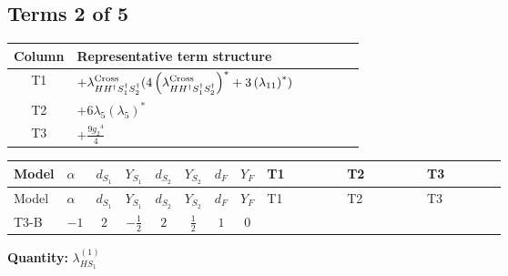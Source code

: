 \documentclass[8pt]{article}
\begin{document}
\begin{landscape}
\subsection*{Terms 2 of 5}
\begin{center}
\begin{tabular}{@{}c >{\raggedright\arraybackslash}p{0.82\linewidth}@{}}
\toprule
Column & Representative term structure \\
\midrule
T1 & \(\displaystyle +{\lambda_{H H^\dagger S_1^\dagger S_2^\dagger}^{\rm Cross}} (4 \left({\lambda_{H H^\dagger S_1^\dagger S_2^\dagger}^{\rm Cross}}\right)^{*}+3 \left({\lambda_{11}}\right)^{*})\) \\
\midrule
T2 & \(\displaystyle +6 {\lambda_5} \left({\lambda_5}\right)^{*}\) \\
\midrule
T3 & \(\displaystyle +\frac{9 {g_2}^4}{4}\) \\
\midrule
\bottomrule
\end{tabular}
\end{center}
\smallskip
\tiny
\begin{longtable}{@{}llcccccc >{\raggedright\arraybackslash}p{0.21\linewidth} >{\raggedright\arraybackslash}p{0.21\linewidth} >{\raggedright\arraybackslash}p{0.21\linewidth}@{}}
\toprule
Model & $\alpha$ & $d_{S_1}$ & $Y_{S_1}$ & $d_{S_2}$ & $Y_{S_2}$ & $d_F$ & $Y_F$ & T1 & T2 & T3 \\
\midrule
\endfirsthead
\toprule
Model & $\alpha$ & $d_{S_1}$ & $Y_{S_1}$ & $d_{S_2}$ & $Y_{S_2}$ & $d_F$ & $Y_F$ & T1 & T2 & T3 \\
\midrule
\endhead
T3-B & $-1$ & $2$ & $-\frac{1}{2}$ & $2$ & $\frac{1}{2}$ & $1$ & $0$ & \scriptsize\adjustbox{max width=\linewidth}{$\begin{gathered} +{\lambda_{H H^\dagger S_1^\dagger S_2^\dagger}^{\rm Cross}} (4 \left({\lambda_{H H^\dagger S_1^\dagger S_2^\dagger}^{\rm Cross}}\right)^{*}+3 \left({\lambda_{11}}\right)^{*})\end{gathered}$} & \scriptsize\adjustbox{max width=\linewidth}{$\begin{gathered} +6 {\lambda_5} \left({\lambda_5}\right)^{*}\end{gathered}$} & \scriptsize\adjustbox{max width=\linewidth}{$\begin{gathered} +\frac{9 {g_2}^4}{4}\end{gathered}$} \\
\midrule
\bottomrule
\end{longtable}
\clearpage
\noindent\textbf{Quantity: }$\lambda_{HS_1}^{(1)}$\par\smallskip

\end{landscape}
\end{document}
